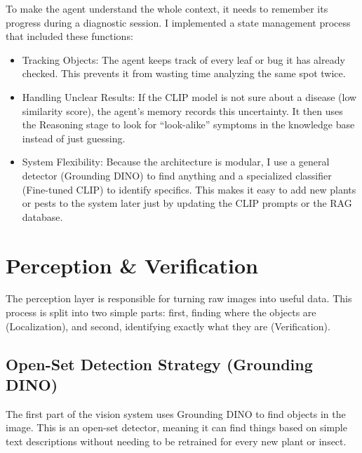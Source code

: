 To make the agent understand the whole context, it needs to remember its progress during a diagnostic session. I implemented a state management process that included these functions:
\begin{itemize}
	\item Tracking Objects: The agent keeps track of every leaf or bug it has already checked. This prevents it from wasting time analyzing the same spot twice.
	\item Handling Unclear Results: If the CLIP model is not sure about a disease (low similarity score), the agent’s memory records this uncertainty. It then uses the Reasoning stage to look for ``look-alike'' symptoms in the knowledge base instead of just guessing.
	\item System Flexibility: Because the architecture is modular, I use a general detector (Grounding DINO) to find anything and a specialized classifier (Fine-tuned CLIP) to identify specifics. This makes it easy to add new plants or pests to the system later just by updating the CLIP prompts or the RAG database.
\end{itemize}


\section{Perception \& Verification}
The perception layer is responsible for turning raw images into useful data. This process is split into two simple parts: first, finding where the objects are (Localization), and second, identifying exactly what they are (Verification).

\subsection{Open-Set Detection Strategy (Grounding DINO)}
The first part of the vision system uses Grounding DINO\cite{liu2023grounding} to find objects in the image. This is an open-set detector, meaning it can find things based on simple text descriptions without needing to be retrained for every new plant or insect.

